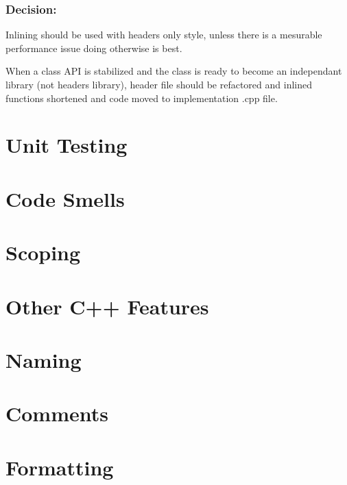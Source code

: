 \documentclass[11pt]{report}
\begin{document}
\subsection{Decision:} Inlining should be used with headers only style, unless there is a mesurable performance issue doing otherwise is best.

When a class API is stabilized and the class is ready to become an independant library (not headers library), header file should be refactored and inlined functions shortened and code moved to implementation .cpp file.


\chapter{Unit Testing}

\chapter{Code Smells}

\chapter{Scoping}

\chapter{Other C++ Features}

\chapter{Naming}

\chapter{Comments}

\chapter{Formatting}
\end{document}
